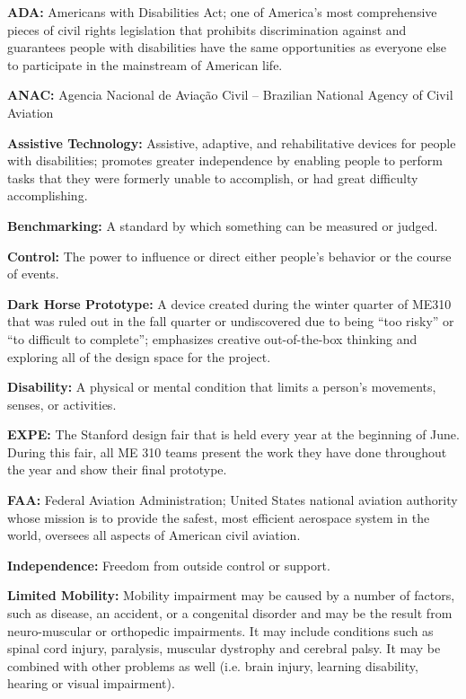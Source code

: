   \item  \textbf{ADA:} Americans with Disabilities Act; one of America's most comprehensive pieces of civil rights legislation that prohibits discrimination against and guarantees people with disabilities have the same opportunities as everyone else to participate in the mainstream of American life.
  \item \textbf{ANAC:} Agencia Nacional de Aviação Civil – Brazilian National Agency of Civil Aviation
  \item  \textbf{Assistive Technology:} Assistive, adaptive, and rehabilitative devices for people with disabilities; promotes greater independence by enabling people to perform tasks that they were formerly unable to accomplish, or had great difficulty accomplishing.
  \item  \textbf{Benchmarking:} A standard by which something can be measured or judged.
  \item \textbf{Control:} The power to influence or direct either people's behavior or the course of events.
  \item \textbf{Dark Horse Prototype:} A device created during the winter quarter of ME310 that was ruled out in the fall quarter or undiscovered due to being “too risky” or “to difficult to complete”; emphasizes creative out-of-the-box thinking and exploring all of the design space for the project. 
  \item \textbf{Disability:} A physical or mental condition that limits a person's movements, senses, or activities.
  \item \textbf{EXPE:} The Stanford design fair that is held every year at the beginning of June. During this fair, all ME 310 teams present the work they have done throughout the year and show their final prototype.
  \item \textbf{FAA:} Federal Aviation Administration; United States national aviation authority whose mission is to provide the safest, most efficient aerospace system in the world, oversees all aspects of American civil aviation.
  \item \textbf{Independence:} Freedom from outside control or support.
  \item \textbf{Limited Mobility:} Mobility impairment may be caused by a number of factors, such as disease, an accident, or a congenital disorder and may be the result from neuro-muscular or orthopedic impairments. It may include conditions such as spinal cord injury, paralysis, muscular dystrophy and cerebral palsy. It may be combined with other problems as well (i.e. brain injury, learning disability, hearing or visual impairment).
